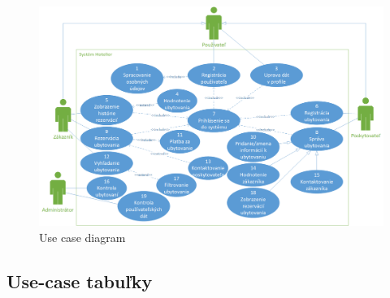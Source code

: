 \begin{figure}[!htbp]
  \centering
  \includegraphics[width=\linewidth]{img/uc_diagram.png}
  \caption{Use case diagram}
  \label{uc_diagram}
\end{figure}	

\newpage

\subsection{Use-case tabuľky}


